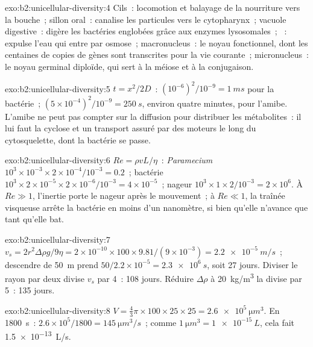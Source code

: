 \begin{solution}{exo:b2:unicellular-diversity:4}
Cils~: locomotion et balayage de la nourriture vers la bouche~; sillon
oral~: canalise les particules vers le cytopharynx~; vacuole
digestive~: digère les bactéries englobées grâce aux enzymes
lysosomales~; ~: expulse l'eau qui entre par
osmose~; macronucleus~: le noyau fonctionnel, dont les centaines de
copies de gènes sont transcrites pour la vie courante~; micronucleus~:
le noyau germinal diploïde, qui sert à la méiose et à la conjugaison.
\end{solution}

\begin{solution}{exo:b2:unicellular-diversity:5}
$t = x^2/2D$~: $(10^{-6})^2/10^{-9} = \qty{1}{ms}$ pour la bactérie~;
$(5\times 10^{-4})^2/10^{-9} = \qty{250}{s}$, environ quatre minutes,
pour l'amibe. L'amibe ne peut pas compter sur la diffusion pour
distribuer les métabolites~: il lui faut la cyclose et un transport
assuré par des moteurs le long du cytosquelette, dont la bactérie se
passe.
\end{solution}

\begin{solution}{exo:b2:unicellular-diversity:6}
$Re = \rho vL/\eta$~: \emph{Paramecium} $10^3\times 10^{-3}\times
2\times 10^{-4}/10^{-3} = 0.2$~; bactérie $10^3\times 2\times
10^{-5}\times 2\times 10^{-6}/10^{-3} = 4\times 10^{-5}$~; nageur
$10^3\times 1\times 2/10^{-3} = 2\times 10^6$. À $Re \gg 1$, l'inertie
porte le nageur après le mouvement~; à $Re \ll 1$, la traînée visqueuse
arrête la bactérie en moins d'un nanomètre, si bien qu'elle n'avance
que tant qu'elle bat.
\end{solution}

\begin{solution}{exo:b2:unicellular-diversity:7}
$v_s = 2r^2\Delta\rho g/9\eta = 2\times 10^{-10}\times 100\times
9.81/(9\times 10^{-3}) = \qty{2.2e-5}{m/s}$~; descendre de \qty{50}{m}
prend $50/2.2\times 10^{-5} = \qty{2.3e6}{s}$, soit 27 jours. Diviser le
rayon par deux divise $v_s$ par 4~: 108 jours. Réduire $\Delta\rho$ à
\qty{20}{kg/m^3} la divise par 5~: 135 jours.
\end{solution}

\begin{solution}{exo:b2:unicellular-diversity:8}
$V = \tfrac{4}{3}\pi\times 100\times 25\times 25 =
\qty{2.6e5}{\micro m^3}$. En \qty{1800}{s}~: $2.6\times 10^5/1800 =
\qty{145}{\micro m^3/s}$~; comme $\qty{1}{\micro m^3} =
\qty{1e-15}{L}$, cela fait \qty{1.5e-13}{L/s}.
\end{solution}

